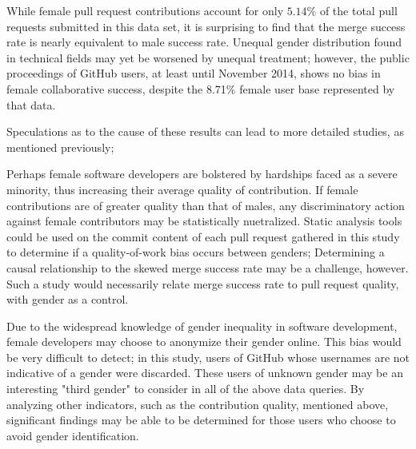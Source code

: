 \documentclass{sigplanconf}
\begin{document}
While female pull request contributions account for only $5.14\%$ of the total pull
requests submitted in this data set, it is surprising to find that the merge
success rate is nearly equivalent to male success rate. Unequal gender
distribution found in technical fields may yet be worsened by unequal treatment;
however, the public proceedings of GitHub users, at least until November 2014,
shows no bias in female collaborative success, despite the 8.71\% female
user base represented by that data.

Speculations as to the cause of these results can lead to more detailed studies,
as mentioned previously;

Perhaps female software developers are bolstered by hardships faced as a severe
minority, thus increasing their average quality of contribution. If female
contributions are of greater quality than that of males, any discriminatory
action against female contributors may be statistically nuetralized. Static
analysis tools could be used on the commit content of each pull request gathered
in this study to determine if a quality-of-work bias occurs between genders;
\cite{staticanalysis} Determining a causal relationship to the skewed merge success rate may be a
challenge, however. Such a study would necessarily relate merge success rate to
pull request quality, with gender as a control.

Due to the widespread knowledge of gender inequality in software development,
female developers may choose to anonymize their gender online. This bias would
be very difficult to detect; in this study, users of GitHub whose usernames are
not indicative of a gender were discarded. These users of unknown gender may be
an interesting "third gender" to consider in all of the above data queries. By
analyzing other indicators, such as the contribution quality, mentioned above,
significant findings may be able to be determined for those users who choose to
avoid gender identification.








\end{document}
